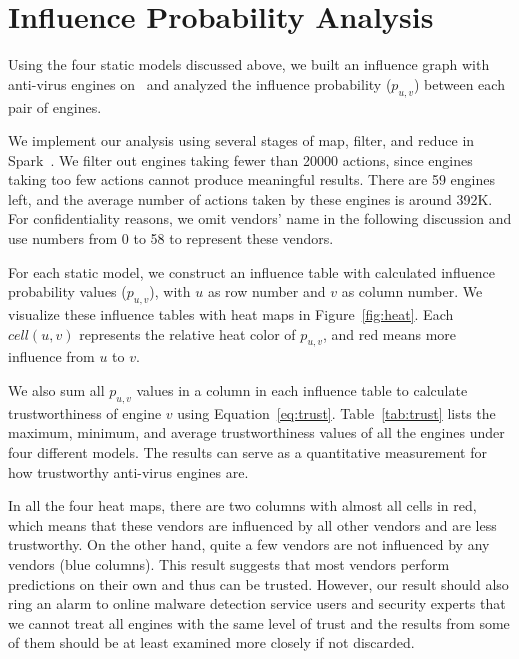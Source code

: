 
\vspace{-0.05in}
\section{Influence Probability Analysis}
\label{sec:influenceanalysis}

Using the four static models discussed above, we built an influence graph with anti-virus engines on \vt\ and analyzed 
the influence probability ($p_{u,v}$) between each pair of engines.

We implement our analysis using several stages of map, filter, and reduce in Spark~\cite{spark}. 
We filter out engines taking fewer than 20000 actions,
since engines taking too few actions cannot produce meaningful results.
There are 59 engines left,
and the average number of actions taken by these engines is around 392K.
For confidentiality reasons, we omit vendors' name in the following discussion
and use numbers from 0 to 58 to represent these vendors.


For each static model, 
we construct an influence table with calculated influence probability values ($p_{u,v}$), 
with $u$ as row number and $v$ as column number.
We visualize these influence tables with heat maps in Figure~\ref{fig:heat}. 
Each $cell(u, v)$ represents the relative heat color of $p_{u,v}$, 
and red means more influence from $u$ to $v$. 

We also sum all $p_{u,v}$ values in a column in each influence table 
to calculate trustworthiness of engine $v$ using Equation~\ref{eq:trust}. 
Table~\ref{tab:trust} lists the maximum, minimum, and average trustworthiness values of all the engines under four different models.
The results can serve as a quantitative measurement for how trustworthy anti-virus engines are. 

In all the four heat maps, there are two columns with almost all cells in red,
which means that these vendors are influenced by all other vendors and are less trustworthy.
On the other hand, quite a few vendors are not influenced by any vendors (blue columns).
This result suggests that most vendors perform predictions on their own and thus can be trusted. 
However, our result should also ring an alarm to online malware detection service users and security experts that 
we cannot treat all engines with the same level of trust 
and the results from some of them should be at least examined more closely if not discarded.

